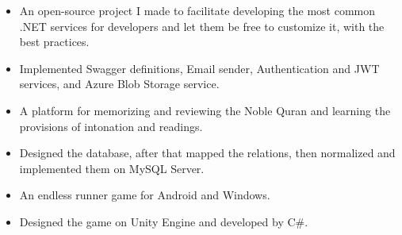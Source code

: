 \begin{itemize}
    \item An open-source project I made to facilitate developing the most common .NET services for developers and let them be free to customize it, with the best practices.
    \item Implemented Swagger definitions, Email sender, Authentication and JWT services, and Azure Blob Storage service.
\end{itemize}

\divider

\begin{itemize}
    \item A platform for memorizing and reviewing the Noble Quran and learning the provisions of intonation and readings.
    \item Designed the database, after that mapped the relations, then normalized and implemented them on MySQL Server.
\end{itemize}

\begin{itemize}
    \item An endless runner game for Android and Windows.
    \item Designed the game on Unity Engine and developed by C\#.
\end{itemize}
